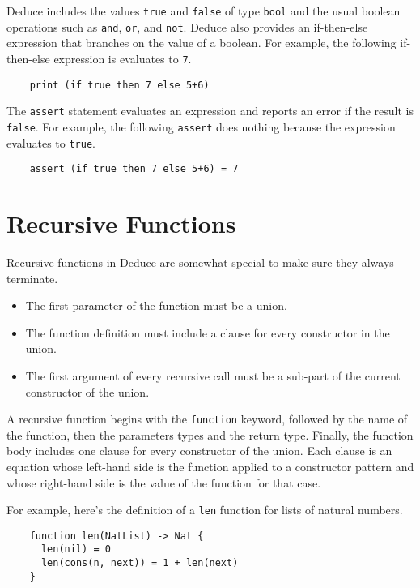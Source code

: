 \documentclass[12pt]{article}
\begin{document}
Deduce includes the values \texttt{true} and \texttt{false} of type
\texttt{bool} and the usual boolean operations such as \texttt{and},
\texttt{or}, and \texttt{not}.  Deduce also provides an if-then-else
expression that branches on the value of a boolean. For example, the
following if-then-else expression is evaluates to \texttt{7}.

\begin{verbatim}
    print (if true then 7 else 5+6)
\end{verbatim}

The \texttt{assert} statement evaluates an expression and reports an
error if the result is \texttt{false}. For example, the following
\texttt{assert} does nothing because the expression evaluates to
\texttt{true}.

\begin{verbatim}
    assert (if true then 7 else 5+6) = 7
\end{verbatim}

\section{Recursive Functions}

Recursive functions in Deduce are somewhat special to make sure they
always terminate.

\begin{itemize}
\item The first parameter of the function must be a union.
\item The function definition must include a clause for every
  constructor in the union.
\item The first argument of every recursive call must be a sub-part of
  the current constructor of the union.
\end{itemize}

A recursive function begins with the \texttt{function} keyword,
followed by the name of the function, then the parameters types and
the return type. Finally, the function body includes one clause for
every constructor of the union. Each clause is an equation whose
left-hand side is the function applied to a constructor pattern and
whose right-hand side is the value of the function for that case.

For example, here's the definition of a \texttt{len} function for
lists of natural numbers.

\begin{verbatim}
    function len(NatList) -> Nat {
      len(nil) = 0
      len(cons(n, next)) = 1 + len(next)
    }
\end{verbatim}
\end{document}
